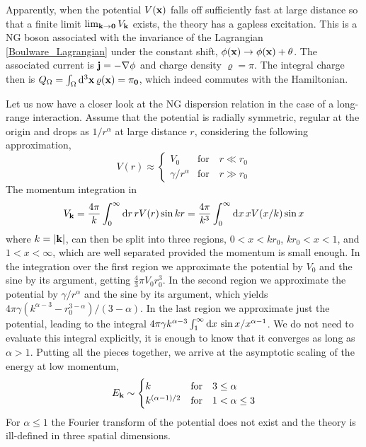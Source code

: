 \documentclass[final,2p,times,12pt,sort&compress]{elsarticle}
\newcommand\vek[1]{{\boldsymbol{\bf #1}}}   %
\newcommand\vr{\varrho}
\newcommand\vt{\theta}
\newcommand\abs[1]{\left|#1\right|}         %
\newcommand\dd{\mathop{{\rm d}\!}\nolimits} %
\newcommand\dthree{\mathop{{\rm d}^3\!}\nolimits} %
\begin{document}
Apparently, when the potential $V(\vek x)$ falls off sufficiently fast at large
distance so that a finite limit $\lim_{\vek k\to\vek0}V_{\vek k}$ exists, the
theory has a gapless excitation. This is a NG boson associated with the
invariance of the Lagrangian \eqref{Boulware_Lagrangian} under the constant
shift,
$\phi(\vek x)\to\phi(\vek x)+\vt$. The associated current is $\vek
j=-\nabla\phi$ and charge density $\vr=\pi$. The integral charge then is
$Q_\Omega=\int_\Omega\dthree\vek x\,\vr(\vek x)=\pi_{\vek0}$, which indeed
commutes with the Hamiltonian.

Let us now have a closer look at the NG dispersion relation in the case of a
long-range interaction. Assume that the potential is radially symmetric,
regular at the origin and drops as $1/r^\alpha$ at large distance $r$,
considering the following approximation,
\begin{equation}
V(r)\approx\begin{cases}
V_0 &\text{for}\quad r\ll r_0\\
\gamma/{r^\alpha} &\text{for}\quad r\gg r_0
\end{cases}
\label{longdistpot}
\end{equation}
The momentum integration in
\begin{equation}
V_{\vek k}=\frac{4\pi}k\int_0^\infty\dd r\, rV(r)\sin kr=
\frac{4\pi}{k^3}\int_0^\infty\dd x\,xV(x/k)\sin x
\label{FTpot}
\end{equation}
where $k=\abs{\vek k}$, can then be split into three regions, $0<x<kr_0$,
$kr_0<x<1$, and $1<x<\infty$, which are well separated provided the momentum is
small enough. In the integration over the first region we approximate the
potential by $V_0$ and the sine by its argument, getting $\frac43\pi V_0r_0^3$.
In the second region we approximate the potential by $\gamma/r^\alpha$ and the
sine by its argument, which yields
$4\pi\gamma\left(k^{\alpha-3}-r_0^{3-\alpha}\right)/(3-\alpha)$. In the last
region we approximate just the potential, leading to the integral
$4\pi\gamma k^{\alpha-3}\int_1^\infty\dd x\,\sin x/x^{\alpha-1}$. We do not
need to evaluate this integral explicitly, it is enough to know that it
converges as long as $\alpha>1$. Putting all the pieces together, we arrive at
the asymptotic scaling of the energy at low momentum,
\begin{equation}
E_{\vek k}\sim
\begin{cases}
k & \text{for}\quad3\leq\alpha\\
k^{(\alpha-1)/2} & \text{for}\quad1<\alpha\leq 3
\end{cases}
\end{equation}
For $\alpha\leq1$ the Fourier transform of the potential does not exist and the
theory is ill-defined in three spatial dimensions.
\end{document}
